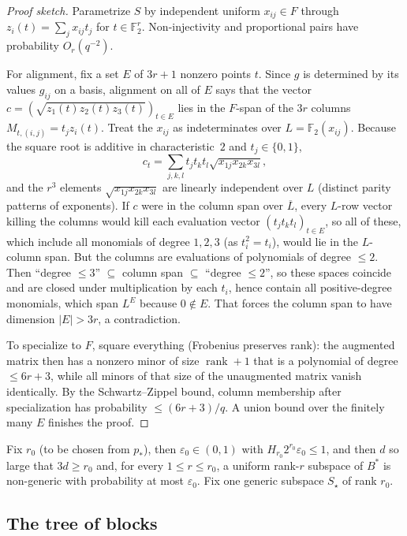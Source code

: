 \documentclass[11pt]{article}
\theoremstyle{definition}
\theoremstyle{remark}
\newcommand{\F}{\mathbb F}
\newcommand{\eps}{\varepsilon}
\DeclareMathOperator{\rank}{rank}
\begin{document}
\begin{proof}[Proof sketch]
Parametrize $S$ by independent uniform $x_{ij}\in F$ through
$z_i(t)=\sum_jx_{ij}t_j$ for $t\in\F_2^r$. Non-injectivity and proportional
pairs have probability $O_r(q^{-2})$.

For alignment, fix a set $E$ of $3r+1$ nonzero points $t$. Since $g$ is
determined by its values $g_{ij}$ on a basis, alignment on all of $E$ says
that the vector $c=(\sqrt{z_1(t)z_2(t)z_3(t)})_{t\in E}$ lies in the $F$-span
of the $3r$ columns $M_{t,(i,j)}=t_jz_i(t)$. Treat the $x_{ij}$ as
indeterminates over $L=\F_2(x_{ij})$. Because the square root is additive in
characteristic~$2$ and $t_j\in\{0,1\}$,
\[
c_t=\sum_{j,k,l}t_jt_kt_l\sqrt{x_{1j}x_{2k}x_{3l}},
\]
and the $r^3$ elements $\sqrt{x_{1j}x_{2k}x_{3l}}$ are linearly independent
over $L$ (distinct parity patterns of exponents). If $c$ were in the column span
over $\overline L$, every $L$-row vector killing the columns would kill each
evaluation vector $(t_jt_kt_l)_{t\in E}$, so all of these, which include all
monomials of degree $1,2,3$ (as $t_i^2=t_i$), would lie in the $L$-column span.
But the columns are evaluations of polynomials of degree $\le2$. Then
``degree $\le3$'' $\subseteq$ column span $\subseteq$ ``degree $\le2$'', so
these spaces coincide and are closed under multiplication by each $t_i$, hence
contain all positive-degree monomials, which span $L^E$ because $0\notin E$.
That forces the column span to have dimension $|E|>3r$, a contradiction.

To specialize to $F$, square everything (Frobenius preserves rank): the
augmented matrix then has a nonzero minor of size $\rank+1$ that is a
polynomial of degree $\le6r+3$, while all minors of that size of the
unaugmented matrix vanish identically. By the Schwartz--Zippel bound, column
membership after specialization has probability $\le(6r+3)/q$. A union bound
over the finitely many $E$ finishes the proof.
\end{proof}

Fix $r_0$ (to be chosen from $p_*$), then $\eps_0\in(0,1)$ with
$H_{r_0}2^{r_0}\eps_0\le1$, and then $d$ so large that $3d\ge r_0$ and, for
every $1\le r\le r_0$, a uniform rank-$r$ subspace of $B^*$ is non-generic with
probability at most $\eps_0$. Fix one generic subspace $S_\star$ of rank $r_0$.

\subsection{The tree of blocks}\label{sec:tree}
\end{document}
